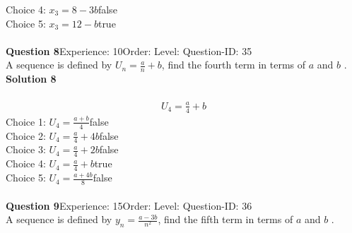 \documentclass{article}
\begin{document}
Choice 4: \hspace{20pt}$x_3=8-3b$\hspace{20pt}false\\
Choice 5: \hspace{20pt}$x_3=12-b$\hspace{20pt}true\\
\\[4pt]
\noindent\textbf{Question 8}\hspace{20pt}Experience: 10\hspace{20pt}Order: \hspace{20pt}Level: \hspace{20pt}Question-ID: 35\\[2pt]
A sequence is defined by $U_n=\displaystyle\frac{a}{n}+b$, find the fourth term in terms of $a$ and $b$ .\\[4pt]
\noindent\textbf{Solution 8}\\[2pt]
\\[-35pt]\begin{align*}
U_4=\displaystyle\frac{a}{4}+b
\end{align*}
Choice 1: \hspace{20pt}$U_4=\displaystyle\frac{a+b}{4}$\hspace{20pt}false\\
Choice 2: \hspace{20pt}$U_4=\displaystyle\frac{a}{4}+4b$\hspace{20pt}false\\
Choice 3: \hspace{20pt}$U_4=\displaystyle\frac{a}{4}+2b$\hspace{20pt}false\\
Choice 4: \hspace{20pt}$U_4=\displaystyle\frac{a}{4}+b$\hspace{20pt}true\\
Choice 5: \hspace{20pt}$U_4=\displaystyle\frac{a+4b}{8}$\hspace{20pt}false\\
\\[4pt]
\noindent\textbf{Question 9}\hspace{20pt}Experience: 15\hspace{20pt}Order: \hspace{20pt}Level: \hspace{20pt}Question-ID: 36\\[2pt]
A sequence is defined by $y_n=\displaystyle\frac{a-3b}{n^2}$, find the fifth term in terms of $a$ and $b$ .\\[4pt]
\end{document}
